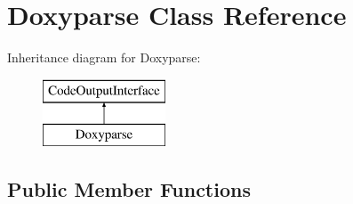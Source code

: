 \hypertarget{class_doxyparse}{}\section{Doxyparse Class Reference}
\label{class_doxyparse}
Inheritance diagram for Doxyparse\+:\begin{figure}[H]
\begin{center}
\leavevmode
\includegraphics[height=2.000000cm]{class_doxyparse}
\end{center}
\end{figure}
\subsection*{Public Member Functions}
